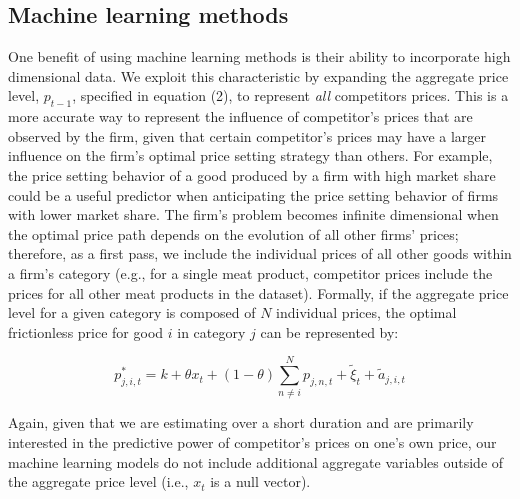 \documentclass[11pt]{article}
\begin{document}
\subsection{Machine learning methods}

One benefit of using machine learning methods is their ability to incorporate high dimensional data. We exploit this characteristic by expanding the aggregate price level, $p_{t-1}$, specified in equation (2), to represent \textit{all} competitors prices. This is a more accurate way to represent the influence of competitor's prices that are observed by the firm, given that certain competitor's prices may have a larger influence on the firm's optimal price setting strategy than others. For example, the price setting behavior of a good produced by a firm with high market share could be a useful predictor when anticipating the price setting behavior of firms with lower market share. The firm's problem becomes infinite dimensional when the optimal price path depends on the evolution of all other firms' prices; therefore, as a first pass, we include the individual prices of all other goods within a firm's category (e.g., for a single meat product, competitor prices include the prices for all other meat products in the dataset). Formally, if the aggregate price level for a given category is composed of $N$ individual prices, the optimal frictionless price for good $i$ in category $j$ can be represented by:   

%
\begin{equation*}
p^*_{j,i,t} = k + \theta x_{t} + (1-\theta)\sum_{n\neq i}^{N} p_{j,n,t} + \widetilde\xi_{t} + \widetilde a_{j,i,t}
\end{equation*}
%

Again, given that we are estimating over a short duration and are primarily interested in the predictive power of competitor's prices on one's own price, our machine learning models do not include additional aggregate variables outside of the aggregate price level (i.e., $x_{t}$ is a null vector).
\end{document}
